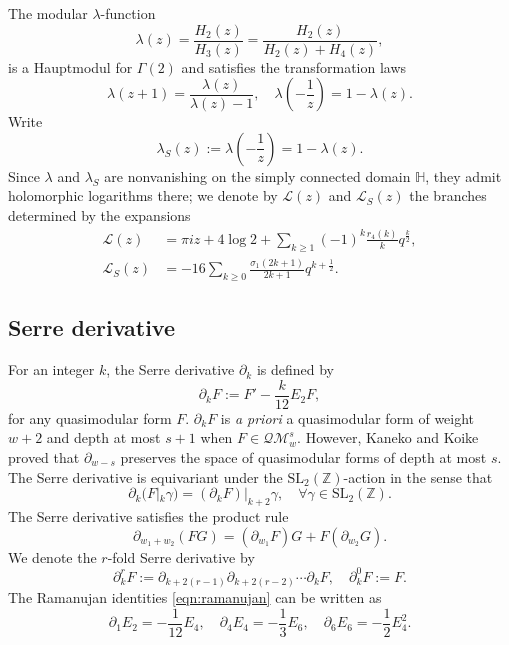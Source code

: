 \documentclass[10pt,reqno]{amsproc}
\newcommand{\QM}{\mathcal{QM}}
\newcommand{\cL}{\mathcal{L}}
\newcommand{\1}{\mathds{1}}	%
\theoremstyle{definition}
\theoremstyle{remark}
\begin{document}
The modular $\lambda$-function
\begin{equation}
    \label{eqn:lambda_def}
    \lambda(z) = \frac{H_{2}(z)}{H_{3}(z)} = \frac{H_{2}(z)}{H_{2}(z) + H_{4}(z)},
\end{equation}
is a Hauptmodul for $\Gamma(2)$ and satisfies the transformation laws
\[
\lambda(z+1) = \frac{\lambda(z)}{\lambda(z) - 1}, \quad \lambda\left( - \frac{1}{z} \right) = 1 - \lambda(z).
\]
Write
\begin{equation}
    \label{eqn:lambdaS_def}
    \lambda_S(z) := \lambda\left(-\frac{1}{z}\right) = 1 - \lambda(z).
\end{equation}
Since $\lambda$ and $\lambda_S$ are nonvanishing on the simply connected domain $\mathbb{H}$, they admit holomorphic logarithms there; we denote by $\cL(z)$ and $\cL_S(z)$ the branches determined by the expansions
\begin{align}
    \cL(z) &= \pi i z + 4 \log 2 + \sum_{k \ge 1} (-1)^k \frac{r_4(k)}{k} q^{\frac{k}{2}}, \label{eqn:L_qexp} \\
    \cL_S(z) &= -16 \sum_{k \geq 0} \frac{\sigma_1(2k + 1)}{2k + 1}q^{k + \frac{1}{2}}. \label{eqn:LS_qexp}
\end{align}


\subsection{Serre derivative}

For an integer $k$, the Serre derivative $\partial_{k}$ is defined by
\[
    \partial_{k}F := F' - \frac{k}{12} E_2 F,
\]
for any quasimodular form $F$.
$\partial_{k}F$ is \emph{a priori} a quasimodular form of weight $w + 2$ and depth at most $s+1$ when $F \in \QM_w^s$. However, Kaneko and Koike \cite[Proposition 3.3]{kaneko2006extremal} proved that $\partial_{w-s}$ preserves the space of quasimodular forms of depth at most $s$.
The Serre derivative is equivariant under the $\mathrm{SL}_2(\mathbb{Z})$-action in the sense that
\[
\partial_k (F|_k \gamma) = (\partial_k F)|_{k+2}\gamma, \quad \forall \gamma \in \mathrm{SL}_2(\mathbb{Z}).
\]
The Serre derivative satisfies the product rule
\[
\partial_{w_1 + w_2} (FG) = (\partial_{w_1}F)G + F(\partial_{w_2}G).
\]
We denote the $r$-fold Serre derivative by
\[
\partial_k^r F := \partial_{k + 2(r-1)} \partial_{k + 2(r-2)} \cdots \partial_{k} F, \quad \partial_k^0 F := F.
\]
The Ramanujan identities \eqref{eqn:ramanujan} can be written as
\begin{equation}
    \label{eqn:ramanujan_serre}
    \partial_1 E_2 = - \frac{1}{12} E_4, \quad \partial_4 E_4 = -\frac{1}{3} E_6, \quad \partial_6 E_6 = - \frac{1}{2} E_4^2.
\end{equation}
\end{document}
